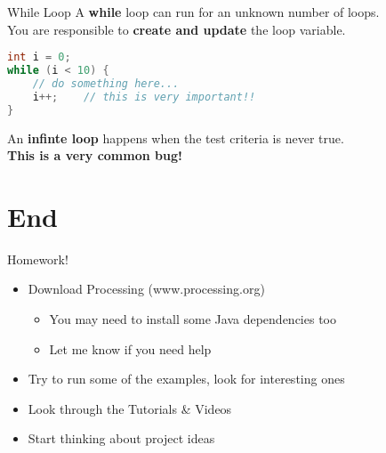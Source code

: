\documentclass[pdf]{beamer}
\begin{document}
\begin{frame}[fragile]{While Loop}
A \textbf{while} loop can run for an unknown number of loops.\\
You are responsible to \textbf{create and update} the loop variable.
\begin{lstlisting}[language=Java]
int i = 0;
while (i < 10) {
    // do something here...
    i++;    // this is very important!!
}

\end{lstlisting}
An \textbf{infinte loop} happens when the test criteria is never true.\\
\textbf{This is a very common bug!}
\end{frame}

\section{End}
\begin{frame}{Homework!}
\begin{itemize}
\item Download Processing (www.processing.org)
    \begin{itemize}
    \item You may need to install some Java dependencies too
    \item Let me know if you need help
    \end{itemize}
\item Try to run some of the examples, look for interesting ones
\item Look through the Tutorials \& Videos
\item Start thinking about project ideas
\end{itemize}
\end{frame}
\end{document}

